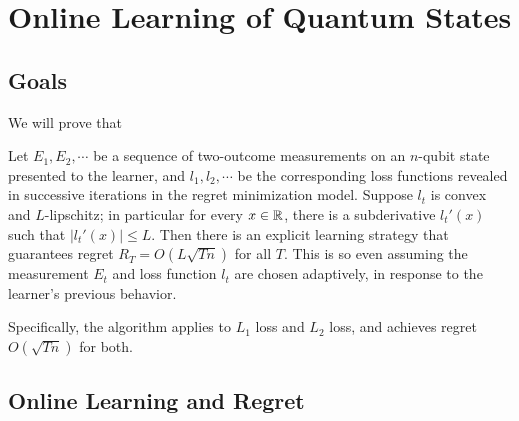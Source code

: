 \documentclass[main.tex]{subfiles}
\begin{document}
\section{Online Learning of Quantum States}

\subsection{Goals}

We will prove that

\begin{theorem}
	Let $E_1, E_2, \cdots$ be a sequence of two-outcome measurements on an $n$-qubit state presented to the learner, and $l_1, l_2, \cdots$ be the corresponding loss functions revealed in successive iterations in the regret minimization model. Suppose $l_t$ is convex and $L$-lipschitz; in particular for every $x \in \mathbb{R}$, there is a subderivative $l_t'(x)$ such that $| l_t'(x)| \leq L$. Then there is an explicit learning strategy that guarantees regret $R_T = O(L \sqrt{Tn})$ for all $T$. This is so even assuming the measurement $E_t$ and loss function $l_t$ are chosen adaptively, in response to the learner's previous behavior. 
	
	Specifically, the algorithm applies to $L_1$ loss and $L_2$ loss, and achieves regret $O(\sqrt{Tn})$ for both. 
\end{theorem}


\subsection{Online Learning and Regret}
\end{document}
